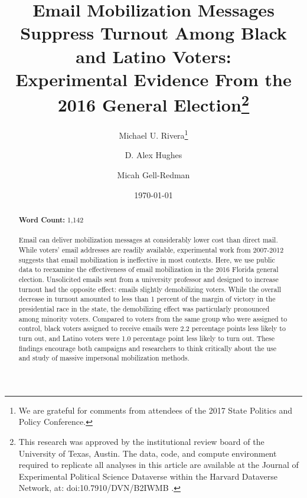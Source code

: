 \documentclass[12pt]{article}
\begin{document}
\author[1]{Michael U. Rivera\thanks{We are grateful for comments from
    attendees of the 2017 State Politics and Policy Conference.}}
\author[1]{D. Alex Hughes} \author[2,3]{Micah Gell-Redman}

\renewcommand\Authands{ and }

\title{Email Mobilization Messages Suppress Turnout Among Black and Latino Voters:\\
  Experimental Evidence From the 2016 General Election\thanks{This
    research was approved by the institutional review board of the
    University of Texas, Austin.  The data, code, and compute
    environment required to replicate all analyses in this article are
    available at the Journal of Experimental Political Science
    Dataverse within the Harvard Dataverse Network, at:
    doi:10.7910/DVN/B2IWMB \citep{rivera2020}.}}  \date{\today}


\maketitle
\thispagestyle{empty}

\begin{abstract}
  \noindent \textbf{Word Count:}  1,142 \\ \\
  Email can deliver mobilization messages at considerably lower cost
  than direct mail. While voters’ email addresses are readily
  available, experimental work from 2007-2012 suggests that email
  mobilization is ineffective in most contexts. Here, we use public
  data to reexamine the effectiveness of email mobilization in the
  2016 Florida general election. Unsolicited emails sent from a
  university professor and designed to increase turnout had the
  opposite effect: emails slightly demobilizing voters. While the
  overall decrease in turnout amounted to less than 1 percent of the
  margin of victory in the presidential race in the state, the
  demobilizing effect was particularly pronounced among minority
  voters. Compared to voters from the same group who were assigned to
  control, black voters assigned to receive emails were 2.2 percentage
  points less likely to turn out, and Latino voters were 1.0
  percentage point less likely to turn out. These findings encourage
  both campaigns and researchers to think critically about the use and
  study of massive impersonal mobilization methods.

\end{abstract}
\end{document}
